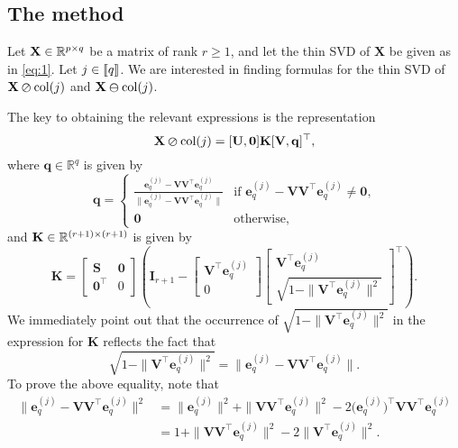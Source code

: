 \documentclass[11pt,a4paper]{article}
\DeclarePairedDelimiter\Brackets{\llbracket}{\rrbracket}
\theoremstyle{break}
\numberwithin{dummy}{section}
\theoremstyle{plain}
\theoremstyle{plain}
\theoremstyle{plain}
\theoremstyle{plain}
\theoremstyle{plain}
\theoremstyle{MyNonumberplain}
\newcommand{\0}{\M{0}}
\newcommand{\M}[1]{\mathbf{#1}}
\newcommand{\R}{\mathbb{R}}
\newcommand{\T}{\top}
\newcommand{\ve}[1]{\mathbf{#1}}
\newcommand{\eve}[2]{\mathbf{e}^{(#1)}_{#2}}
\newcommand{\Mat}[2]{%
  \ifthenelse{\equal{#2}{1}}
  {\R^{#1}}
  {\R^{#1 \times #2}}
}
\newcommand{\delcol}[2]{\M{#1} \varominus {\mathrm{col}}({#2})}
\newcommand{\zercol}[2]{\M{#1} \varoslash \mathrm{col}(#2)}
\begin{document}
\subsection{The method}

Let $\M{X} \in \Mat{p}{q}$ be a matrix of rank $r \geq 1$, and let the thin SVD of $\M{X}$ be given as in \eqref{eq:1}. Let $j \in \Brackets{q}$. We are interested in finding formulas for the thin SVD of $\zercol{X}{j}$ and $\delcol{X}{j}$.

The key to obtaining the relevant expressions is the representation
\begin{equation}
  \label{eq:21}
  \zercol{X}{j}
  =
  [\M{U}, \0] \M{K} [\M{V}, \ve{q}]^\T,
\end{equation}
where $\ve{q} \in \R^q$ is given by
\begin{displaymath}
  \ve{q} =
  \begin{cases}
    \frac{\eve{j}{q} - \M{V} \M{V}^\T \eve{j}{q}}{\| \eve{j}{q} - \M{V} \M{V}^\T \eve{j}{q}\|} & \text{if $\eve{j}{q} - \M{V} \M{V}^\T \eve{j}{q} \neq \0$,}
    \\
    \0 & \text{otherwise,}
  \end{cases}
\end{displaymath}
and $\M{K} \in \Mat{(r+1)}{(r+1)}$ is given by
\begin{displaymath}
  \M{K}
  =
  \begin{bmatrix}
    \M{S} & \0
    \\
    \0^\T & 0
  \end{bmatrix}
  \left(
    \M{I}_{r+1}
    -
    \begin{bmatrix}
      \M{V}^\T \eve{j}{q}
      \\
      0
    \end{bmatrix}
    \begin{bmatrix}
      \M{V}^\T \eve{j}{q}
      \\[1.5ex]
      \sqrt{1 - \| \M{V}^\T \eve{j}{q} \|^2}
    \end{bmatrix}^\T \right).
\end{displaymath}
We immediately point out that the occurrence of $\sqrt{1 - \| \M{V}^\T \eve{j}{q} \|^2}$ in the expression for $\M{K}$ reflects the fact that
\begin{equation}
  \label{eq:22}
  \sqrt{1 - \| \M{V}^\T \eve{j}{q} \|^2}
  =
  \| \eve{j}{q} - \M{V} \M{V}^\T \eve{j}{q}\|.
\end{equation}
To prove the above equality, note that
\begin{align*}
  \| \eve{j}{q} - \M{V} \M{V}^\T \eve{j}{q}\|^2
  & =
    \| \eve{j}{q} \|^2 +  \| \M{V} \M{V}^\T \eve{j}{q}\|^2
    - 2 \big(\eve{j}{q}\big)^\T \M{V} \M{V}^\T \eve{j}{q}
  \\
  & =
    1 + \| \M{V} \M{V}^\T \eve{j}{q}\|^2 - 2 \| \M{V}^\T \eve{j}{q} \|^2.
\end{align*}
\end{document}
